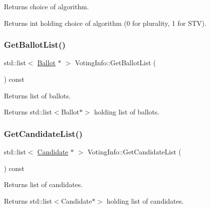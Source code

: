 Returns choice of algorithm. 

\begin{DoxyReturn}{Returns}
int holding choice of algorithm (0 for plurality, 1 for S\+TV). 
\end{DoxyReturn}
\mbox{\label{classVotingInfo_a73ac1888c3695a912ef6991b6667eeaf}} 
\subsubsection{\texorpdfstring{Get\+Ballot\+List()}{GetBallotList()}}
{\footnotesize\ttfamily std\+::list$<$ \hyperlink{classBallot}{Ballot} $\ast$ $>$ Voting\+Info\+::\+Get\+Ballot\+List (\begin{DoxyParamCaption}{ }\end{DoxyParamCaption}) const}



Returns list of ballots. 

\begin{DoxyReturn}{Returns}
std\+::list$<$\+Ballot$\ast$$>$ holding list of ballots. 
\end{DoxyReturn}
\mbox{\label{classVotingInfo_ad64e934ebd73e4be9e89458e0a304030}} 
\subsubsection{\texorpdfstring{Get\+Candidate\+List()}{GetCandidateList()}}
{\footnotesize\ttfamily std\+::list$<$ \hyperlink{classCandidate}{Candidate} $\ast$ $>$ Voting\+Info\+::\+Get\+Candidate\+List (\begin{DoxyParamCaption}{ }\end{DoxyParamCaption}) const}



Returns list of candidates. 

\begin{DoxyReturn}{Returns}
std\+::list$<$\+Candidate$\ast$$>$ holding list of candidates. 
\end{DoxyReturn}
\mbox{\label{classVotingInfo_a387f2f8293d6b90d2c877b237e2e43f6}} 
